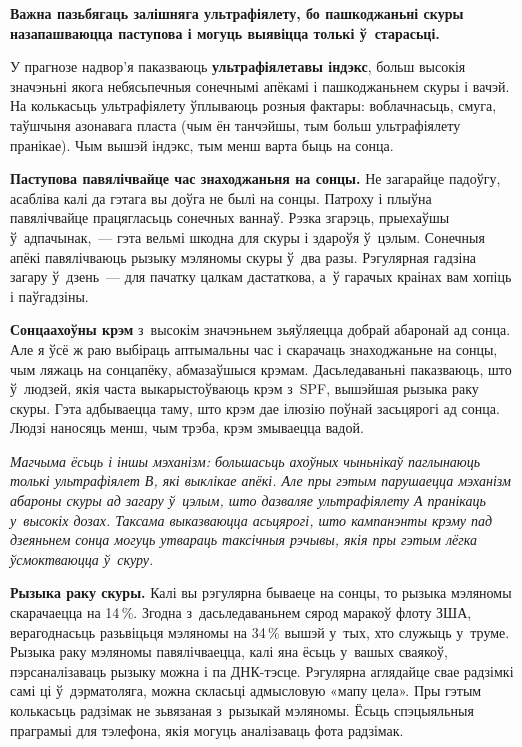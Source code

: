 \textbf{Важна пазьбягаць залішняга ультрафіялету, бо пашкоджаньні скуры назапашваюцца паступова і могуць выявіцца толькі ў~старасьці.}

У прагнозе надвор'я паказваюць \textbf{ультрафіялетавы індэкс}, больш высокія значэньні якога небясьпечныя сонечнымі апёкамі і пашкоджаньнем скуры і вачэй. На колькасьць ультрафіялету ўплываюць розныя фактары: воблачнасьць, смуга, таўшчыня азонавага пласта (чым ён танчэйшы, тым больш ультрафіялету пранікае). Чым вышэй індэкс, тым менш варта быць на сонца.

\textbf{Паступова павялічвайце час знаходжаньня на сонцы.} Не загарайце падоўгу, асабліва калі да гэтага вы доўга не былі на сонцы. Патроху і плыўна павялічвайце працягласьць сонечных ваннаў. Рэзка згарэць, прыехаўшы ў~адпачынак,~--- гэта вельмі шкодна для скуры і здароўя ў~цэлым. Сонечныя апёкі павялічваюць рызыку мэляномы скуры ў~два разы. Рэгулярная гадзіна загару ў~дзень~--- для пачатку цалкам дастаткова, а~ў гарачых краінах вам хопіць і паўгадзіны.

\textbf{Сонцаахоўны крэм} з~высокім значэньнем зьяўляецца добрай абаронай ад сонца. Але я ўсё ж раю выбіраць аптымальны час і скарачаць знаходжаньне на сонцы, чым ляжаць на сонцапёку, абмазаўшыся крэмам. Дасьледаваньні паказваюць, што ў~людзей, якія часта выкарыстоўваюць крэм з~SPF, вышэйшая рызыка раку скуры. Гэта адбываецца таму, што крэм дае ілюзію поўнай засьцярогі ад сонца. Людзі наносяць менш, чым трэба, крэм змываецца вадой.

\emph{Магчыма ёсьць і іншы мэханізм: большасьць ахоўных чыньнікаў паглынаюць толькі ультрафіялет В, які выклікае апёкі. Але пры гэтым парушаецца мэханізм абароны скуры ад загару ў~цэлым, што дазваляе ультрафіялету А пранікаць у~высокіх дозах. Таксама выказваюцца асьцярогі, што кампанэнты крэму пад дзеяньнем сонца могуць утвараць таксічныя рэчывы, якія пры гэтым лёгка ўсмоктваюцца ў~скуру.}

\textbf{Рызыка раку скуры.} Калі вы рэгулярна бываеце на сонцы, то рызыка мэляномы скарачаецца на 14\,\%. Згодна з~дасьледаваньнем сярод маракоў флоту ЗША, верагоднасьць разьвіцьця мэляномы на 34\,\% вышэй у~тых, хто служыць у~труме. Рызыка раку мэляномы павялічваецца, калі яна ёсьць у~вашых сваякоў, пэрсаналізаваць рызыку можна і па ДНК-тэсце. Рэгулярна аглядайце свае радзімкі самі ці ў~дэрматоляга, можна скласьці адмысловую «мапу цела». Пры гэтым колькасьць радзімак не зьвязаная з~рызыкай мэляномы. Ёсьць спэцыяльныя праграмыі для тэлефона, якія могуць аналізаваць фота радзімак.

